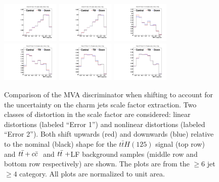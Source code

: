 \begin{description}
\begin{figure}[hbtp]
 \begin{center}
   \includegraphics[width=0.245\textwidth]{Figures/Analysis_2_Diagrams/SystPlot_CMS_ttH_CSVCErr1_ttH125_ljets_jge6_tge4}
   \includegraphics[width=0.245\textwidth]{Figures/Analysis_2_Diagrams/SystPlot_CMS_ttH_CSVCErr2_ttH125_ljets_jge6_tge4}
   \includegraphics[width=0.245\textwidth]{Figures/Analysis_2_Diagrams/SystPlot_CMS_ttH_CSVCErr1_ttbarPlusCCbar_ljets_jge6_tge4}
   \includegraphics[width=0.245\textwidth]{Figures/Analysis_2_Diagrams/SystPlot_CMS_ttH_CSVCErr2_ttbarPlusCCbar_ljets_jge6_tge4}
   \includegraphics[width=0.245\textwidth]{Figures/Analysis_2_Diagrams/SystPlot_CMS_ttH_CSVCErr1_ttbar_ljets_jge6_tge4}
   \includegraphics[width=0.245\textwidth]{Figures/Analysis_2_Diagrams/SystPlot_CMS_ttH_CSVCErr2_ttbar_ljets_jge6_tge4}
   \caption{ Comparison of the MVA discriminator when shifting to
     account for the uncertainty on the charm jets scale
     factor extraction.  Two classes of distortion in the scale factor
     are considered: linear distortions (labeled ``Error 1'')
     and nonlinear distortions (labeled ``Error 2'').  Both
     shift upwards (red) and downwards (blue) relative to the nominal
     (black) shape for the $t\bar{t}H(125)$ signal (top row) and
     $t{\bar{t}}+c{\bar{c}}~$ and $t{\bar{t}}~+$LF background samples (middle row
     and bottom row respectively) are shown.  The plots are from the $\geq 6$ jet $\geq 4$
     category.  All plots are normalized to unit area.}
   \label{fig:CSVC}
 \end{center}
\end{figure}



\end{description}
